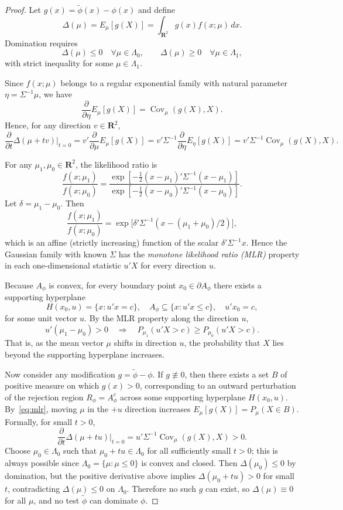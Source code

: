 \documentclass[12pt]{article}
\begin{document}
\begin{proof}
Let $g(x) = \tilde \phi(x) - \phi(x)$ and define
\[
\Delta(\mu) = E_\mu[g(X)] = \int_{\mathbf{R}^2} g(x) f(x;\mu)\,dx.
\]
Domination requires
\[
\Delta(\mu) \le 0 \quad \forall \mu \in \Lambda_0, 
\qquad
\Delta(\mu) \ge 0 \quad \forall \mu \in \Lambda_1,
\]
with strict inequality for some $\mu \in \Lambda_1$.

Since $f(x;\mu)$ belongs to a regular exponential family with natural parameter
$\eta = \Sigma^{-1}\mu$, we have
\[
\frac{\partial}{\partial \eta} E_\mu[g(X)]
  = \operatorname{Cov}_\mu(g(X), X).
\]
Hence, for any direction $v \in \mathbf{R}^2$,
\begin{equation}\label{eq:directional}
\frac{\partial}{\partial t}\Delta(\mu + t v)\Big|_{t=0}
= v'\frac{\partial}{\partial \mu} E_\mu[g(X)]
= v'\Sigma^{-1}\frac{\partial}{\partial \eta} E_\eta[g(X)]
= v'\Sigma^{-1}\operatorname{Cov}_\mu(g(X), X).
\end{equation}

For any $\mu_1, \mu_0 \in \mathbf{R}^2$, the likelihood ratio is
\[
\frac{f(x;\mu_1)}{f(x;\mu_0)}
  = \frac{\exp\!\left[-\tfrac{1}{2}(x-\mu_1)'\Sigma^{-1}(x-\mu_1)\right]}
         {\exp\!\left[-\tfrac{1}{2}(x-\mu_0)'\Sigma^{-1}(x-\mu_0)\right]}.
\]
Let $\delta = \mu_1 - \mu_0$.  Then
\[
\frac{f(x;\mu_1)}{f(x;\mu_0)}
  = \exp\!\big[\delta'\Sigma^{-1}(x - (\mu_1+\mu_0)/2)\big],
\]
which is an affine (strictly increasing) function of the scalar $\delta'\Sigma^{-1}x$.  
Hence the Gaussian family with known $\Sigma$ has the \emph{monotone likelihood ratio (MLR)} property in each one-dimensional statistic $u'X$ for every direction $u$.

Because $A_\phi$ is convex, for every boundary point $x_0 \in \partial A_\phi$
there exists a supporting hyperplane
\[
H(x_0,u) = \{x : u'x = c\}, \quad 
A_\phi \subseteq \{x : u'x \le c\}, \quad u'x_0 = c,
\]
for some unit vector $u$.  By the MLR property along the direction $u$,
\[
u'(\mu_1 - \mu_0) > 0 
\quad \Rightarrow \quad
P_{\mu_1}(u'X > c) \ge P_{\mu_0}(u'X > c).
\tag{MLR}
\label{eq:mlr}
\]
That is, as the mean vector $\mu$ shifts in direction $u$, 
the probability that $X$ lies beyond the supporting hyperplane increases.

Now consider any modification $g = \tilde\phi - \phi$.
If $g \not\equiv 0$, then there exists a set $B$ of positive measure on which $g(x) > 0$,
corresponding to an outward perturbation of the rejection region $R_\phi = A_\phi^c$
across some supporting hyperplane $H(x_0,u)$.  
By~\eqref{eq:mlr}, moving $\mu$ in the $+u$ direction increases 
$E_\mu[g(X)] = P_\mu(X \in B)$.  
Formally, for small $t > 0$,
\[
\frac{\partial}{\partial t}\Delta(\mu + t u)\Big|_{t=0}
= u'\Sigma^{-1}\operatorname{Cov}_\mu(g(X),X) > 0.
\]
Choose $\mu_0 \in \Lambda_0$ such that $\mu_0 + t u \in \Lambda_0$ for all sufficiently small $t > 0$; this is always possible since $\Lambda_0 = \{\mu : \mu \le 0\}$ is convex and closed.  
Then $\Delta(\mu_0) \le 0$ by domination, but the positive derivative above implies
$\Delta(\mu_0 + t u) > 0$ for small $t$, contradicting 
$\Delta(\mu) \le 0$ on $\Lambda_0$.  
Therefore no such $g$ can exist, so $\Delta(\mu) \equiv 0$ for all $\mu$,
and no test $\tilde\phi$ can dominate $\phi$.
\end{proof}
\end{document}

